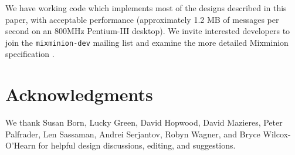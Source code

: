 \documentclass[final,inpress,inline]{ieee}
\begin{document}
We have working code which implements most of the designs described in this
paper, with acceptable performance (approximately 1.2 MB of messages per
second on an 800MHz Pentium-III desktop).  We invite interested developers to
join the {\tt mixminion-dev} mailing list and examine the more detailed
Mixminion specification \cite{mixminion-spec}.


\section*{Acknowledgments}

We thank Susan Born, Lucky Green, David Hopwood, David Mazieres, Peter
Palfrader, Len Sassaman, Andrei Serjantov, Robyn Wagner, and Bryce
Wilcox-O'Hearn for helpful design discussions, editing, and suggestions.





\end{document}

